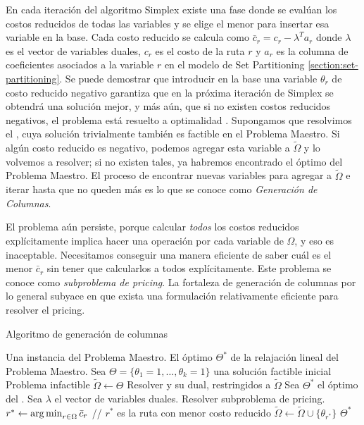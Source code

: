 En cada iteración del algoritmo Simplex existe una fase donde se evalúan los costos reducidos de todas las variables y se elige el menor para insertar esa variable en la base. Cada costo reducido se calcula como $\bar{c}_r = c_r - \lambda^{T}a_r$ donde $\lambda$ es el vector de variables duales, $c_r$ es el costo de la ruta $r$ y $a_r$ es la columna de coeficientes asociados a la variable $r$ en el modelo de Set Partitioning \ref{section:set-partitioning}. Se puede demostrar que introducir en la base una variable $\theta_r$ de costo reducido negativo garantiza que en la próxima iteración de Simplex se obtendrá una solución mejor, y más aún, que si no existen costos reducidos negativos, el problema está resuelto a optimalidad \cite{chvatal1983linear}. Supongamos que resolvimos el , cuya solución trivialmente también es factible en el Problema Maestro. Si algún costo reducido es negativo, podemos agregar esta variable a $\tilde{\Omega}$ y lo volvemos a resolver; si no existen tales, ya habremos encontrado el óptimo del Problema Maestro. El proceso de encontrar nuevas variables para agregar a $\tilde{\Omega}$ e iterar hasta que no queden más es lo que se conoce como \emph{Generación de Columnas}.

El problema aún persiste, porque calcular \emph{todos} los costos reducidos explícitamente implica hacer una operación por cada variable de $\Omega$, y eso es inaceptable. Necesitamos conseguir una manera eficiente de saber cuál es el menor $\bar{c}_r$ sin tener que calcularlos a todos explícitamente. Este problema se conoce como \emph{subproblema de pricing}. La fortaleza de generación de columnas por lo general subyace en que exista una formulación relativamente eficiente para resolver el pricing.

\begin{algorithm}[H]
    \caption{Algoritmo de generación de columnas}
    \label{al:column-generation}
    \begin{algorithmic}[1]
        \Require Una instancia del Problema Maestro. 
        \Ensure El óptimo $\Theta^{*}$ de la relajación lineal del Problema Maestro. 
        \State Sea $\Theta = \{\theta_1 = 1, \dots, \theta_k = 1\}$ una solución factible inicial
        \If{$\Theta = \emptyset$}
            \Return Problema infactible
        \EndIf
        \State $\tilde{\Omega} \gets \Theta$
            \State Resolver  y su dual, restringidos a $\tilde{\Omega}$
            \State Sea $\Theta^{*}$ el óptimo del .
            \State Sea $\lambda$ el vector de variables duales.
            \State Resolver subproblema de pricing.
            \State $r^{*} \gets \operatorname*{arg\,min}_{r \in \Omega}{\bar{c}_r}$ // $r^{*}$ es la ruta con menor costo reducido
            	\Break
            \EndIf
            \State $\tilde{\Omega} \gets \tilde{\Omega} \cup \{\theta_{r^{*}}\}$
        \EndWhile
        \Return $\Theta^{*}$
    \end{algorithmic}
\end{algorithm}

